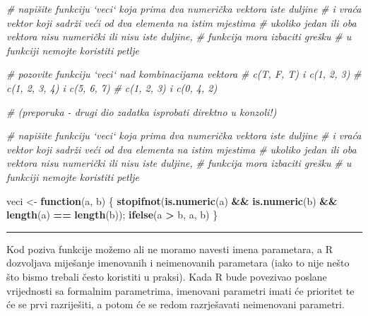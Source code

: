 \documentclass[]{book}
\newenvironment{Shaded}{\begin{snugshade}}{\end{snugshade}}
\newcommand{\KeywordTok}[1]{\textcolor[rgb]{0.13,0.29,0.53}{\textbf{#1}}}
\newcommand{\StringTok}[1]{\textcolor[rgb]{0.31,0.60,0.02}{#1}}
\newcommand{\CommentTok}[1]{\textcolor[rgb]{0.56,0.35,0.01}{\textit{#1}}}
\newcommand{\ControlFlowTok}[1]{\textcolor[rgb]{0.13,0.29,0.53}{\textbf{#1}}}
\newcommand{\OperatorTok}[1]{\textcolor[rgb]{0.81,0.36,0.00}{\textbf{#1}}}
\newcommand{\NormalTok}[1]{#1}
\theoremstyle{definition}
\theoremstyle{definition}
\theoremstyle{definition}
\theoremstyle{remark}
\begin{document}
\begin{Shaded}
\begin{Highlighting}[]
\CommentTok{# napišite funkciju `veci` koja prima dva numerička vektora iste duljine }
\CommentTok{# i vraća vektor koji sadrži veći od dva elementa na istim mjestima}
\CommentTok{# ukoliko jedan ili oba vektora nisu numerički ili nisu iste duljine, }
\CommentTok{# funkcija mora izbaciti grešku}
\CommentTok{# u funkciji nemojte koristiti petlje}

\CommentTok{# pozovite funkciju `veci` nad kombinacijama vektora}
\CommentTok{# c(T, F, T) i c(1, 2, 3)}
\CommentTok{# c(1, 2, 3, 4) i c(5, 6, 7)}
\CommentTok{# c(1, 2, 3) i c(0, 4, 2)}

\CommentTok{# (preporuka - drugi dio zadatka isprobati direktno u konzoli!)}
\end{Highlighting}
\end{Shaded}

\begin{Shaded}
\begin{Highlighting}[]
\CommentTok{# napišite funkciju `veci` koja prima dva numerička vektora iste duljine }
\CommentTok{# i vraća vektor koji sadrži veći od dva elementa na istim mjestima}
\CommentTok{# ukoliko jedan ili oba vektora nisu numerički ili nisu iste duljine, }
\CommentTok{# funkcija mora izbaciti grešku}
\CommentTok{# u funkciji nemojte koristiti petlje}

\NormalTok{veci <-}\StringTok{ }\ControlFlowTok{function}\NormalTok{(a, b) \{}
    \KeywordTok{stopifnot}\NormalTok{(}\KeywordTok{is.numeric}\NormalTok{(a) }\OperatorTok{&&}\StringTok{ }\KeywordTok{is.numeric}\NormalTok{(b) }\OperatorTok{&&}\StringTok{ }\KeywordTok{length}\NormalTok{(a) }\OperatorTok{==}\StringTok{ }\KeywordTok{length}\NormalTok{(b));}
    \KeywordTok{ifelse}\NormalTok{(a }\OperatorTok{>}\StringTok{ }\NormalTok{b, a, b)}
\NormalTok{\}}
\end{Highlighting}
\end{Shaded}

\begin{center}\rule{0.5\linewidth}{\linethickness}\end{center}

Kod poziva funkcije možemo ali ne moramo navesti imena parametara, a R
dozvoljava miješanje imenovanih i neimenovanih parametara (iako to nije
nešto što bismo trebali često koristiti u praksi). Kada R bude povezivao
poslane vrijednosti sa formalnim parametrima, imenovani parametri imati
će prioritet te će se prvi razriješiti, a potom će se redom razrješavati
neimenovani parametri.
\end{document}
